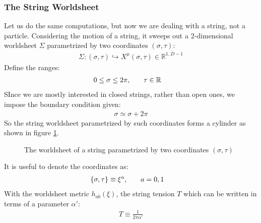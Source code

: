 \subsubsection{The String Worldsheet}
Let us do the same computations, but now we are dealing with a string, not a particle. Considering the motion of a string, it sweeps out a 2-dimensional worldsheet $\Sigma$ parametrized by two coordinates $(\sigma, \tau)$:
\begin{align}
    \Sigma : (\sigma,\tau) \hookrightarrow X^{\mu} (\sigma, \tau) \in \mathbb{R} ^{1,D-1}
\end{align}
Define the ranges:
\begin{align}
    0 \le \sigma \le 2\pi, & \qq{} \tau \in \mathbb{R}
\end{align}
SInce we are mostly interested in closed strings, rather than open ones, we impose the boundary condition given:
\begin{align}
    \sigma \simeq \sigma + 2\pi
\end{align}
So the string worldsheet parametrized by such coordinates forms a cylinder as shown in figure \ref{fig:worldsheet}.
\begin{figure}[h]
    \centering
    \caption{The worldsheet of a string parametrized by two coordinates $(\sigma, \tau)$}
    \label{fig:worldsheet}
\end{figure}
It is useful to denote the coordinates as:
\begin{align}
    \lbrace \sigma, \tau \rbrace \equiv \xi ^{a}, & \qq{} a=0,1
\end{align}
With the worldsheet metric $h_{ab} (\xi)$, the string tension $T$ which can be written in terms of a parameter $\alpha '$:
\begin{align}
    T \equiv \frac{1}{2\pi \alpha '}    
\end{align}
